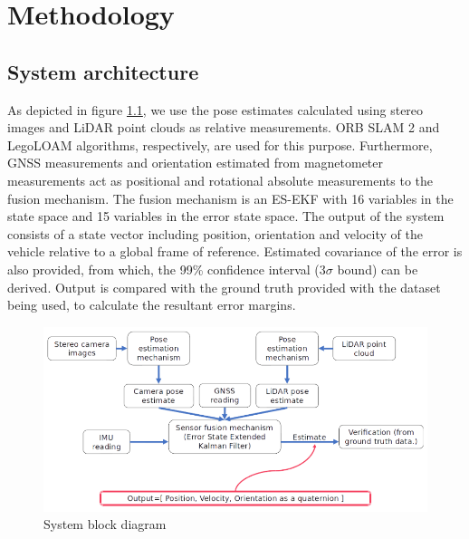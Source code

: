 \chapter{Methodology}





\section{System architecture}
\label{sec:SystemArchitecture}
As depicted in figure \ref{fig:pa:systemBlockDiagram}, we use the pose estimates calculated using stereo images and \gls{LiDAR} point clouds as relative measurements. ORB SLAM 2 and LegoLOAM algorithms, respectively, are used for this purpose. Furthermore, \gls{GNSS} measurements and orientation estimated from magnetometer measurements act as positional and rotational absolute measurements to the fusion mechanism. The fusion mechanism is an \gls{ES-EKF} with 16 variables in the state space and 15 variables in the error state space. The output of the system consists of a state vector including position, orientation and velocity of the vehicle relative to a global frame of reference. Estimated covariance of the error is also provided, from which, the 99\% confidence interval ($3\sigma$ bound) can be derived. Output is compared with the ground truth provided with the dataset being used, to calculate the resultant error margins.
\begin{figure}[h]
	\begin{center}
	\includegraphics[width=\textwidth]{figs/system-block-diagram.png}
	\end{center}
	\vspace{-0.5cm}
	\caption{System block diagram}
	\label{fig:pa:systemBlockDiagram}
	\vspace{0.5cm}
\end{figure}

